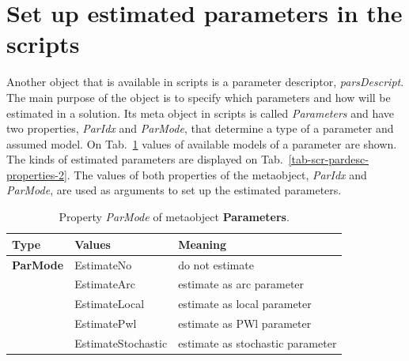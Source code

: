 \documentclass [10pt,letterpaper]{report}
\begin{document}
\section{Set up estimated parameters in the scripts}
\label{section-scripting-pardescript}
Another object that is available in scripts is a parameter descriptor, {\sl parsDescript}.
The main purpose of the object is to specify which parameters and how will be estimated in
a solution. Its meta object in scripts is called {\sl Parameters} and have two properties,
{\sl ParIdx} and {\sl ParMode}, that determine a type of a parameter and assumed model.
On Tab.~\ref{tab-scr-pardesc-properties-1} values of available models of a parameter are
shown. The kinds of estimated parameters are displayed on Tab.~\ref{tab-scr-pardesc-properties-2}.
The values of both properties of the metaobject, {\sl ParIdx} and {\sl ParMode}, are used
as arguments to set up the estimated parameters.


\begin{table}[htb]
\centering
\footnotesize
\begin{tabular}{llp{}}
\hline
Type & Values & Meaning\\
\hline
  {\bf ParMode} & EstimateNo         & do not estimate \\
                & EstimateArc        & estimate as arc parameter \\
                & EstimateLocal      & estimate as local parameter \\
                & EstimatePwl        & estimate as PWl parameter \\
                & EstimateStochastic & estimate as stochastic parameter \\
\hline
\end{tabular}
\caption{Property {\sl ParMode} of metaobject {\bf Parameters}.}
\label{tab-scr-pardesc-properties-1}
\end{table}
\end{document}
